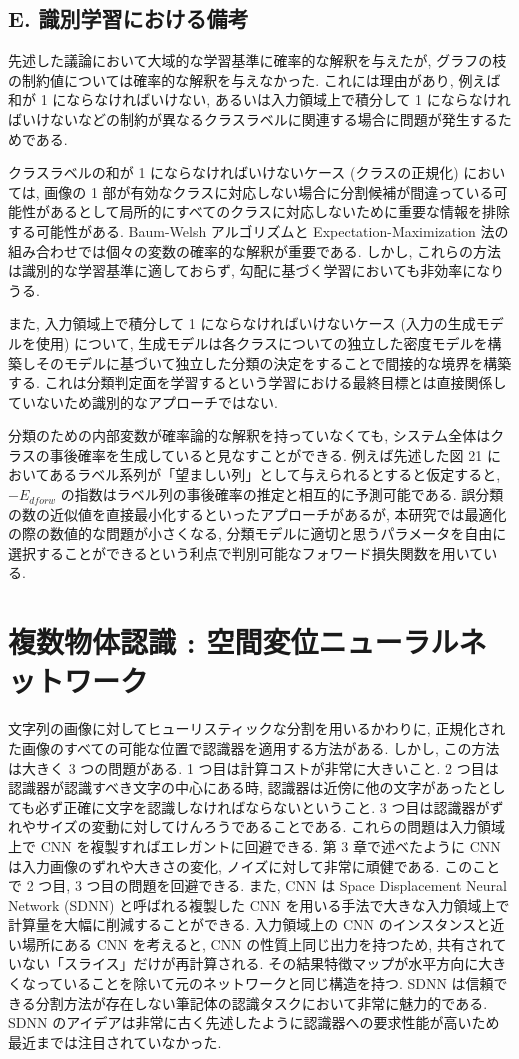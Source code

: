 \documentclass[twocolumn]{jarticle}     %
\begin{document}
\subsection{E. 識別学習における備考}
先述した議論において大域的な学習基準に確率的な解釈を与えたが, グラフの枝の制約値については確率的な解釈を与えなかった. これには理由があり, 例えば和が 1 にならなければいけない, あるいは入力領域上で積分して 1 にならなければいけないなどの制約が異なるクラスラベルに関連する場合に問題が発生するためである.\par
クラスラベルの和が 1 にならなければいけないケース (クラスの正規化) においては, 画像の 1 部が有効なクラスに対応しない場合に分割候補が間違っている可能性があるとして局所的にすべてのクラスに対応しないために重要な情報を排除する可能性がある. Baum-Welsh アルゴリズムと Expectation-Maximization 法の組み合わせでは個々の変数の確率的な解釈が重要である. しかし, これらの方法は識別的な学習基準に適しておらず, 勾配に基づく学習においても非効率になりうる.\par
また, 入力領域上で積分して 1 にならなければいけないケース (入力の生成モデルを使用) について, 生成モデルは各クラスについての独立した密度モデルを構築しそのモデルに基づいて独立した分類の決定をすることで間接的な境界を構築する. これは分類判定面を学習するという学習における最終目標とは直接関係していないため識別的なアプローチではない. 
\par
分類のための内部変数が確率論的な解釈を持っていなくても, システム全体はクラスの事後確率を生成していると見なすことができる. 例えば先述した図 21 においてあるラベル系列が「望ましい列」として与えられるとすると仮定すると, $-E_{dforw}$ の指数はラベル列の事後確率の推定と相互的に予測可能である. 
誤分類の数の近似値を直接最小化するといったアプローチがあるが, 本研究では最適化の際の数値的な問題が小さくなる, 分類モデルに適切と思うパラメータを自由に選択することができるという利点で判別可能なフォワード損失関数を用いている.

\section{複数物体認識 : 空間変位ニューラルネットワーク}
文字列の画像に対してヒューリスティックな分割を用いるかわりに, 正規化された画像のすべての可能な位置で認識器を適用する方法がある. 
しかし, この方法は大きく 3 つの問題がある. 1 つ目は計算コストが非常に大きいこと. 2 つ目は認識器が認識すべき文字の中心にある時, 認識器は近傍に他の文字があったとしても必ず正確に文字を認識しなければならないということ. 3 つ目は認識器がずれやサイズの変動に対してけんろうであることである. これらの問題は入力領域上で CNN を複製すればエレガントに回避できる. 第 3 章で述べたように CNN は入力画像のずれや大きさの変化, ノイズに対して非常に頑健である. このことで 2 つ目, 3 つ目の問題を回避できる. また, CNN は Space Displacement Neural Network (SDNN) と呼ばれる複製した CNN を用いる手法で大きな入力領域上で計算量を大幅に削減することができる. 入力領域上の CNN のインスタンスと近い場所にある CNN を考えると, CNN の性質上同じ出力を持つため, 共有されていない「スライス」だけが再計算される. その結果特徴マップが水平方向に大きくなっていることを除いて元のネットワークと同じ構造を持つ. 
SDNN は信頼できる分割方法が存在しない筆記体の認識タスクにおいて非常に魅力的である. SDNN のアイデアは非常に古く先述したように認識器への要求性能が高いため最近までは注目されていなかった. 
\end{document}
